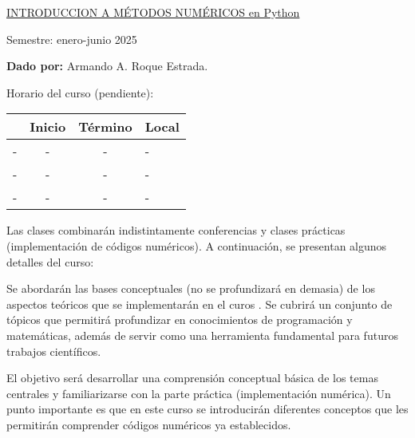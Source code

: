 \documentclass[12pt]{amsart} %
\begin{document}

\uline{\Large{INTRODUCCION A  MÉTODOS NUMÉRICOS en Python}}%

\vspace{14pt}

\large{Semestre: enero-junio 2025}

\vspace{14pt}


\textbf{Dado por:} Armando A. Roque Estrada.

\vspace{8pt}

\hspace{0.375in}  Horario del curso (pendiente):
\begin{table}[h]
	\begin{tabular}{c| c| c| l}
		& Inicio & Término& Local \\
		\hline
		- & -  & - & -\\
		- & -  & -&  -\\
		- & - & - &  - \\\hline
	\end{tabular}
\end{table}

Las clases combinarán indistintamente conferencias y clases prácticas (implementación de códigos numéricos). A continuación, se presentan algunos detalles del curso:
\vspace{8pt}

Se abordarán las bases conceptuales (no se profundizará en demasia) de los aspectos teóricos que se implementarán en el curos . Se cubrirá un conjunto de tópicos que permitirá profundizar en conocimientos de programación y matemáticas, además de servir como una herramienta fundamental para futuros trabajos científicos.
\vspace{8pt}

El objetivo será desarrollar una comprensión conceptual básica de los temas centrales y familiarizarse con la parte práctica (implementación numérica). Un punto importante es que en este curso se introducirán diferentes conceptos que les permitirán comprender códigos numéricos ya establecidos.
\vspace{8pt}
\end{document}
